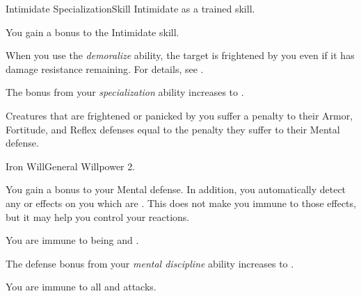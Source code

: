 


  \begin{feat}{Intimidate Specialization}{Skill}
    \featpre Intimidate as a trained skill.

     You gain a  bonus to the Intimidate skill.

     When you use the \textit{demoralize} ability, the target is frightened by you even if it has damage resistance remaining.
    For details, see .

     The bonus from your \textit{specialization} ability increases to .

     Creatures that are frightened or panicked by you suffer a penalty to their Armor, Fortitude, and Reflex defenses equal to the penalty they suffer to their Mental defense.
  \end{feat}

  \begin{feat}{Iron Will}{General}
    \featpre Willpower 2.

     You gain a  bonus to your Mental defense.
    In addition, you automatically detect any  or  effects on you which are .
    This does not make you immune to those effects, but it may help you control your reactions.

     You are immune to being \stunned and \confused.

     The defense bonus from your \textit{mental discipline} ability increases to .

     You are immune to all  and  attacks.
  \end{feat}


